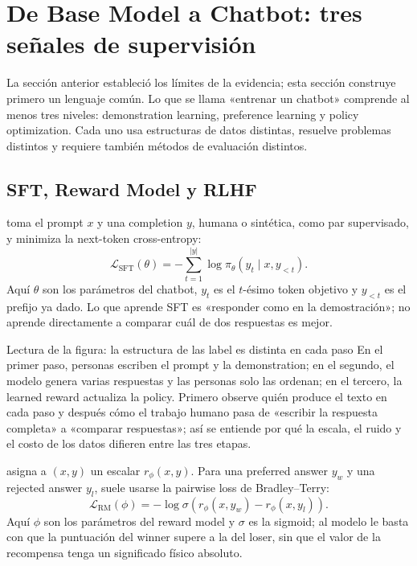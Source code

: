 \section{De Base Model a Chatbot: tres señales de supervisión}

La sección anterior estableció los límites de la evidencia; esta sección construye primero un lenguaje común. Lo que se llama «entrenar un chatbot» comprende al menos tres niveles: demonstration learning, preference learning y policy optimization. Cada uno usa estructuras de datos distintas, resuelve problemas distintos y requiere también métodos de evaluación distintos.

\subsection{SFT, Reward Model y RLHF}

 toma el prompt $x$ y una completion $y$, humana o sintética, como par supervisado, y minimiza la next-token cross-entropy:
\[
\mathcal{L}_{\mathrm{SFT}}(\theta)
=-\sum_{t=1}^{|y|}\log \pi_{\theta}(y_t\mid x,y_{<t}).
\]
Aquí $\theta$ son los parámetros del chatbot, $y_t$ es el $t$-ésimo token objetivo y $y_{<t}$ es el prefijo ya dado. Lo que aprende SFT es «responder como en la demostración»; no aprende directamente a comparar cuál de dos respuestas es mejor.


\begin{knowledgebox}{Lectura de la figura: la estructura de las label es distinta en cada paso}
En el primer paso, personas escriben el prompt y la demonstration; en el segundo, el modelo genera varias respuestas y las personas solo las ordenan; en el tercero, la learned reward actualiza la policy. Primero observe quién produce el texto en cada paso y después cómo el trabajo humano pasa de «escribir la respuesta completa» a «comparar respuestas»; así se entiende por qué la escala, el ruido y el costo de los datos difieren entre las tres etapas.
\end{knowledgebox}

 asigna a $(x,y)$ un escalar $r_{\phi}(x,y)$. Para una preferred answer $y_w$ y una rejected answer $y_l$, suele usarse la pairwise loss de Bradley--Terry:
\[
\mathcal{L}_{\mathrm{RM}}(\phi)
=-\log \sigma\!\left(r_{\phi}(x,y_w)-r_{\phi}(x,y_l)\right).
\]
Aquí $\phi$ son los parámetros del reward model y $\sigma$ es la sigmoid; al modelo le basta con que la puntuación del winner supere a la del loser, sin que el valor de la recompensa tenga un significado físico absoluto.

